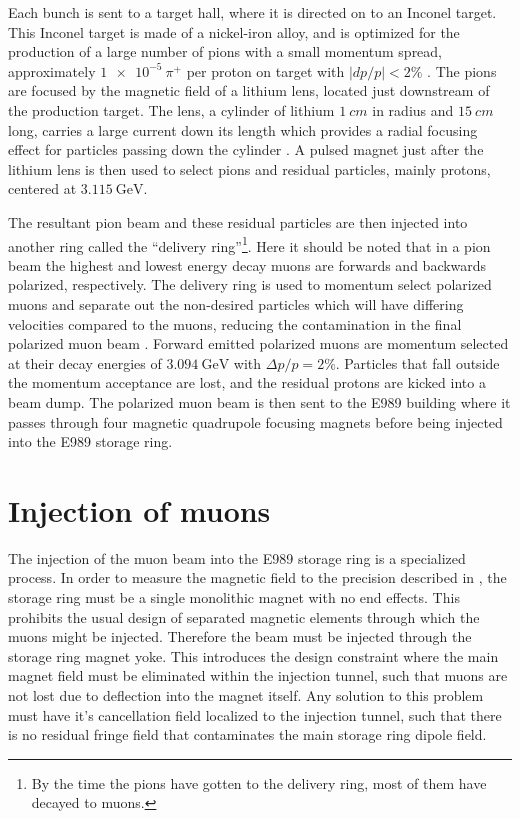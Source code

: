 Each bunch is sent to a target hall, where it is directed on to an Inconel target. This Inconel target is made of a nickel-iron alloy, and is optimized for the production of a large number of pions with a small momentum spread, approximately $\SI{1e-5}{\pi^{+}}$ per proton on target with $|dp/p| < 2 \%$ \cite{Stratakis:2017uci}. The pions are focused by the magnetic field of a lithium lens, located just downstream of the production target. The lens, a cylinder of lithium $\SI{1}{cm}$ in radius and $\SI{15}{cm}$ long, carries a large current down its length which provides a radial focusing effect for particles passing down the cylinder \cite{LiLens}. A pulsed magnet just after the lithium lens is then used to select pions and residual particles, mainly protons, centered at $\SI{3.115}{\GeV}$.


The resultant pion beam and these residual particles are then injected into another ring called the ``delivery ring''\footnote{By the time the pions have gotten to the delivery ring, most of them have decayed to muons.}. Here it should be noted that in a pion beam the highest and lowest energy decay muons are forwards and backwards polarized, respectively. The delivery ring is used to momentum select polarized muons and separate out the non-desired particles which will have differing velocities compared to the muons, reducing the contamination in the final polarized muon beam \cite{Stratakis:2017uci}. Forward emitted polarized muons are momentum selected at their decay energies of $\SI{3.094}{\GeV}$ with $\Delta p / p = 2\%$. Particles that fall outside the momentum acceptance are lost, and the residual protons are kicked into a beam dump. The polarized muon beam is then sent to the E989 building where it passes through four magnetic quadrupole focusing magnets before being injected into the E989 storage ring.




\section{Injection of muons}
\label{sec:injection}


The injection of the muon beam into the E989 storage ring is a specialized process. In order to measure the magnetic field to the precision described in , the storage ring must be a single monolithic magnet with no end effects. This prohibits the usual design of separated magnetic elements through which the muons might be injected. Therefore the beam must be injected through the storage ring magnet yoke. This introduces the design constraint where the main magnet field must be eliminated within the injection tunnel, such that muons are not lost due to deflection into the magnet itself. Any solution to this problem must have it's cancellation field localized to the injection tunnel, such that there is no residual fringe field that contaminates the main storage ring dipole field. 


